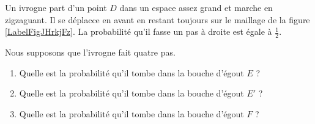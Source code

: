 
\begin{exercice}\label{exosmath-0381}

    Un ivrogne part d'un point \( D\) dans un espace assez grand et marche en zigzaguant. Il se déplacce en avant en restant toujours sur le maillage de la figure \ref{LabelFigJHrkjFz}.  La probabilité qu'il fasse un pas à droite est égale à \( \frac{ 1 }{2}\).

\newcommand{\CaptionFigJHrkjFz}{La grille sur laquelle se déplace l'ivrogne des exercices \ref{exosmath-0381} et \ref{exosmath-0382}.}

Nous supposons que l'ivrogne fait quatre pas.
\begin{enumerate}
    \item
        Quelle est la probabilité qu'il tombe dans la bouche d'égout \( E\) ?
    \item
        Quelle est la probabilité qu'il tombe dans la bouche d'égout \( E'\) ?
    \item
        Quelle est la probabilité qu'il tombe dans la bouche d'égout \( F\) ?
\end{enumerate}

\end{exercice}
